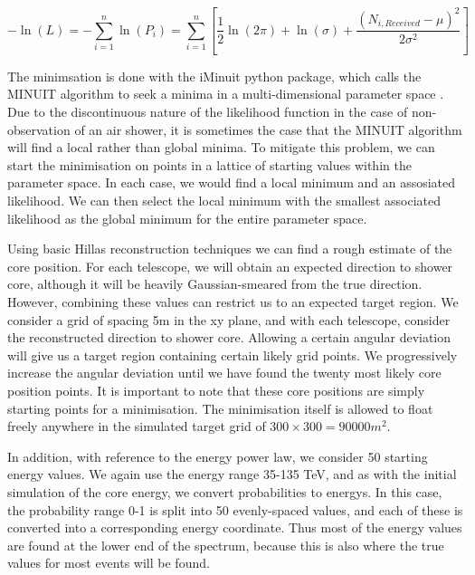 \documentclass[11pt]{article}
\begin{document}
\[ - \ln(L) = - \sum_{i=1}^{n} \ln(P_{i}) =  \sum_{i=1}^{n} [ \frac{1}{2}\ln(2 \pi) + \ln(\sigma) + \frac{(N_{i, Received} - \mu)^{2}}{2 \sigma^{2}}]\]

The minimsation is done with the iMinuit python package, which calls the MINUIT algorithm to seek a minima in a multi-dimensional parameter space \cite{James75}. Due to the discontinuous nature of the likelihood function in the case of non-observation of an air shower, it is sometimes the case that the MINUIT algorithm will find a local rather than global minima. To mitigate this problem, we can start the minimisation on points in a lattice of starting values within the parameter space. In each case, we would find a local minimum and an assosiated likelihood. We can then select the local minimum with the smallest associated likelihood as the global minimum for the entire parameter space. 

Using basic Hillas reconstruction techniques we can find a rough estimate of the core position. For each telescope, we will obtain an expected direction to shower core, although it will be heavily Gaussian-smeared from the true direction. However, combining these values can restrict us to an expected target region. We consider a grid of spacing 5m in the xy plane, and with each telescope, consider the reconstructed direction to shower core. Allowing a certain angular deviation will give us a target region containing certain likely grid points. We progressively increase the angular deviation until we have found the twenty most likely core position points. It is important to note that these core positions are simply starting points for a minimisation. The minimisation itself is allowed to float freely anywhere in the simulated target grid of $300 \times 300 = 90000 m^{2}$.

In addition, with reference to the energy power law, we consider 50 starting energy values. We again use the energy range 35-135 TeV, and as with the initial simulation of the core energy, we convert probabilities to energys. In this case, the probability range 0-1 is split into 50 evenly-spaced values, and each of these is converted into a corresponding energy coordinate. Thus most of the energy values are found at the lower end of the spectrum, because this is also where the true values for most events will be found.
\end{document}
